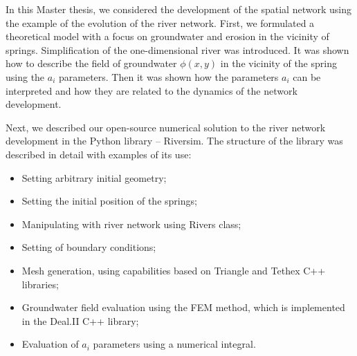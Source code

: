 \documentclass[]{pracamgr}
\begin{document}
    In this Master thesis, we considered the development of the spatial network using the example of the evolution of the river network. First, we formulated a theoretical model with a focus on groundwater and erosion in the vicinity of springs. Simplification of the one-dimensional river was introduced. It was shown how to describe the field of groundwater $\phi(x, y)$ in the vicinity of the spring using the $a_i$ parameters. Then it was shown how the parameters $a_i$ can be interpreted and how they are related to the dynamics of the network development.\par

    Next, we described our open-source numerical solution to the river network development in the Python library -- Riversim. The structure of the library was described in detail with examples of its use: 
    
    \begin{itemize}
      \item Setting arbitrary initial geometry;
      \item Setting the initial position of the springs;
      \item Manipulating with river network using Rivers class;
      \item Setting of boundary conditions;
      \item Mesh generation, using capabilities based on Triangle and Tethex C++ libraries;
      \item Groundwater field evaluation using the FEM method, which is implemented in the Deal.II C++ library;
      \item Evaluation of $a_i$ parameters using a numerical integral.
    \end{itemize}
\end{document}
